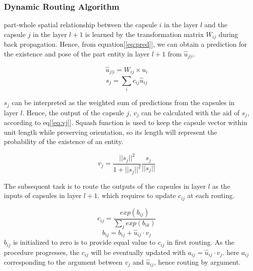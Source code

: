 \subsubsection{Dynamic Routing Algorithm}

part-whole spatial relationship between the capsule $i$ in the layer $l$ and the capsule $j$ in the layer $l+1$ is learned by the transformation matrix $W_{ij}$ during back propagation. Hence, from equation[\ref{eq:pred}], we can obtain a prediction for the existence and pose of the part entity in layer $l+1$ from $\hat{u}_{j|i}$. 

\begin{equation} \label{eq:pred}
\hat{u}_{j|i} = W_{ij} \times u_i
\end{equation}
\begin{equation} \label{eq:sum}
s_{j} = \sum_{i}^{} c_{ij}\hat{u}_{ij}
\end{equation}


$s_j$ can be interpreted as the weighted sum of predictions from the capsules in layer $l$. Hence, the output of the capsule $j$, $v_j$ can be calculated with the aid of $s_j$, according to eq[\ref{eq:vj}].  Squash function is used to keep the capsule vector within unit length while preserving orientation, so its length will represent the probability of the existence of an entity.

\begin{equation} \label{eq:vj}
v_{j} = \frac{||s_j||^2}{1+||s_j||^2} \frac{s_j}{||s_j||}
\end{equation}


The subsequent task is to route the outputs of the capsules in layer $l$ as the inputs of capsules in layer $l+1$. which requires to update $c_{ij}$ at each routing.

\begin{equation} \label{eq:softmax}
c_{ij} = \frac{exp(b_{ij})}{ \sum_{j}^{} exp(b_{ik})}
\end{equation}
\begin{equation} \label{eq:bij}
b_{ij} = b_{ij}+\hat{u}_{ij} \cdot v_{j}
\end{equation}
$b_{ij}$ is initialized to zero is to provide equal value to $c_{ij}$ in first routing. As the procedure progresses, the $c_{ij}$ will be eventually updated with $a_{ij} = \hat{u}_{ij} \cdot v_{j}$. here $a_{ij}$ corresponding to the argument between $v_j$ and $\hat{u}_{ij}$, hence routing by argument.